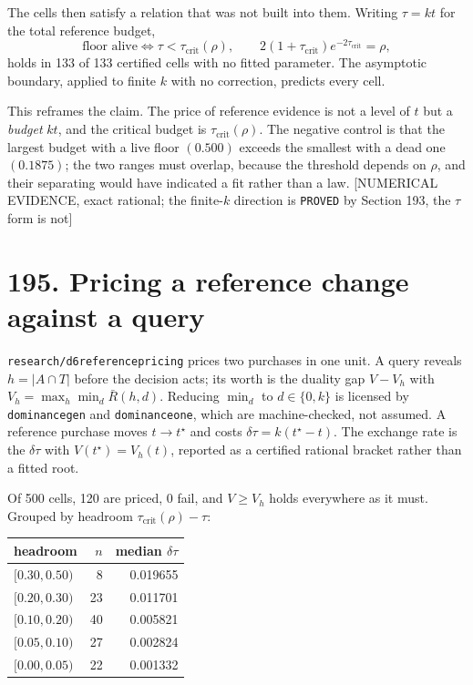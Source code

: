 \documentclass[9pt,twocolumn]{article}
\newcommand{\eclass}[1]{\textsf{[#1]}}
\renewcommand{\_}{\CIGunderscore\allowbreak}
\begin{document}
The cells then satisfy a relation that was not built into them. Writing $\tau=kt$ for the total reference budget,
\[ \text{floor alive} \iff \tau<\tau_{\mathrm{crit}}(\rho),\qquad 2(1+\tau_{\mathrm{crit}})e^{-2\tau_{\mathrm{crit}}}=\rho, \]
holds in 133 of 133 certified cells with no fitted parameter. The asymptotic boundary, applied to finite $k$ with no correction, predicts every cell.

This reframes the claim. The price of reference evidence is not a level of $t$ but a \emph{budget} $kt$, and the critical budget is $\tau_{\mathrm{crit}}(\rho)$. The negative control is that the largest budget with a live floor $(0.500)$ exceeds the smallest with a dead one $(0.1875)$; the two ranges must overlap, because the threshold depends on $\rho$, and their separating would have indicated a fit rather than a law. \eclass{NUMERICAL EVIDENCE, exact rational; the finite-$k$ direction is \texttt{PROVED} by Section 193, the $\tau$ form is not}

\section*{195. Pricing a reference change against a query}

\texttt{research/d6\_reference\_pricing\_20260912} prices two purchases in one unit. A query reveals $h=|A\cap T|$ before the decision acts; its worth is the duality gap $V-V_h$ with $V_h=\max_h\min_d \bar R(h,d)$. Reducing $\min_d$ to $d\in\{0,k\}$ is licensed by \texttt{dominance\_gen} and \texttt{dominance\_one}, which are machine-checked, not assumed. A reference purchase moves $t\to t^\star$ and costs $\delta\tau=k(t^\star-t)$. The exchange rate is the $\delta\tau$ with $V(t^\star)=V_h(t)$, reported as a certified rational bracket rather than a fitted root.

Of 500 cells, 120 are priced, 0 fail, and $V\ge V_h$ holds everywhere as it must. Grouped by headroom $\tau_{\mathrm{crit}}(\rho)-\tau$:

\begin{center}\small
\begin{tabular}{lrr}
\toprule
headroom & $n$ & median $\delta\tau$\\
\midrule
$[0.30,0.50)$ & 8 & 0.019655\\
$[0.20,0.30)$ & 23 & 0.011701\\
$[0.10,0.20)$ & 40 & 0.005821\\
$[0.05,0.10)$ & 27 & 0.002824\\
$[0.00,0.05)$ & 22 & 0.001332\\
\bottomrule
\end{tabular}
\end{center}
\end{document}
